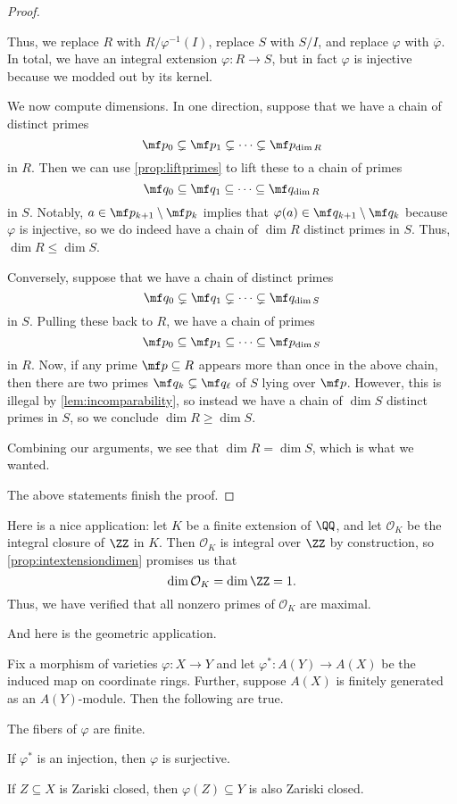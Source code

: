 \begin{proof}
\begin{itemize}
		Thus, we replace $R$ with $R/\varphi^{-1}(I)$, replace $S$ with $S/I$, and replace $\varphi$ with $\overline\varphi$. In total, we have an integral extension $\varphi:R\to S$, but in fact $\varphi$ is injective because we modded out by its kernel.

		We now compute dimensions. In one direction, suppose that we have a chain of distinct primes
		\[\mf p_0\subsetneq\mf p_1\subsetneq\cdots\subsetneq\mf p_{\dim R}\]
		in $R$. Then we can use \autoref{prop:liftprimes} to lift these to a chain of primes
		\[\mf q_0\subseteq\mf q_1\subseteq\cdots\subseteq\mf q_{\dim R}\]
		in $S$. Notably, $a\in\mf p_{k+1}\setminus\mf p_k$ implies that $\varphi(a)\in\mf q_{k+1}\setminus\mf q_k$ because $\varphi$ is injective, so we do indeed have a chain of $\dim R$ distinct primes in $S$. Thus, $\dim R\le\dim S$.

		Conversely, suppose that we have a chain of distinct primes
		\[\mf q_0\subsetneq\mf q_1\subsetneq\cdots\subsetneq\mf q_{\dim S}\]
		in $S$. Pulling these back to $R$, we have a chain of primes
		\[\mf p_0\subseteq\mf p_1\subseteq\cdots\subseteq\mf p_{\dim S}\]
		in $R$. Now, if any prime $\mf p\subseteq R$ appears more than once in the above chain, then there are two primes $\mf q_k\subsetneq\mf q_\ell$ of $S$ lying over $\mf p$. However, this is illegal by \autoref{lem:incomparability}, so instead we have a chain of $\dim S$ distinct primes in $S$, so we conclude $\dim R\ge\dim S$.

		Combining our arguments, we see that $\dim R=\dim S$, which is what we wanted.
	\end{itemize}
	The above statements finish the proof.
\end{proof}
\begin{remark}[Nir]
	Here is a nice application: let $K$ be a finite extension of $\QQ$, and let $\mathcal O_K$ be the integral closure of $\ZZ$ in $K$. Then $\mathcal O_K$ is integral over $\ZZ$ by construction, so \autoref{prop:intextensiondimen} promises us that
	\[\dim\mathcal O_K=\dim\ZZ=1.\]
	Thus, we have verified that all nonzero primes of $\mathcal O_K$ are maximal.
\end{remark}
And here is the geometric application.
\begin{corollary}
	Fix a morphism of varieties $\varphi:X\to Y$ and let $\varphi^*:A(Y)\to A(X)$ be the induced map on coordinate rings. Further, suppose $A(X)$ is finitely generated as an $A(Y)$-module. Then the following are true.
	\begin{listalph}
		\item The fibers of $\varphi$ are finite.
		\item If $\varphi^*$ is an injection, then $\varphi$ is surjective.
		\item If $Z\subseteq X$ is Zariski closed, then $\varphi(Z)\subseteq Y$ is also Zariski closed.
	\end{listalph}
\end{corollary}
